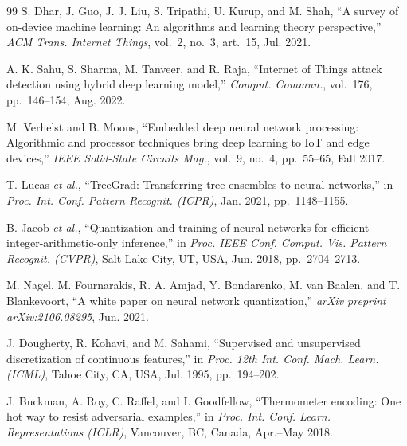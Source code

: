 \documentclass[journal,10pt]{IEEEtran}
\begin{document}
\begin{thebibliography}{99}
S. Dhar, J. Guo, J. J. Liu, S. Tripathi, U. Kurup, and M. Shah,
``A survey of on-device machine learning: An algorithms and learning
theory perspective,''
\emph{ACM Trans. Internet Things}, vol.~2, no.~3, art.~15, Jul. 2021.

A. K. Sahu, S. Sharma, M. Tanveer, and R. Raja,
``Internet of Things attack detection using hybrid deep learning
model,''
\emph{Comput. Commun.}, vol.~176, pp.~146--154, Aug. 2022.

M. Verhelst and B. Moons,
``Embedded deep neural network processing: Algorithmic and processor
techniques bring deep learning to IoT and edge devices,''
\emph{IEEE Solid-State Circuits Mag.}, vol.~9, no.~4, pp.~55--65,
Fall 2017.

T. Lucas \emph{et al.},
``TreeGrad: Transferring tree ensembles to neural networks,''
in \emph{Proc. Int. Conf. Pattern Recognit. (ICPR)},
Jan. 2021, pp.~1148--1155.

B. Jacob \emph{et al.},
``Quantization and training of neural networks for efficient
integer-arithmetic-only inference,''
in \emph{Proc. IEEE Conf. Comput. Vis. Pattern Recognit. (CVPR)},
Salt Lake City, UT, USA, Jun. 2018, pp.~2704--2713.

M. Nagel, M. Fournarakis, R. A. Amjad, Y. Bondarenko, M. van Baalen,
and T. Blankevoort,
``A white paper on neural network quantization,''
\emph{arXiv preprint arXiv:2106.08295}, Jun. 2021.

J. Dougherty, R. Kohavi, and M. Sahami,
``Supervised and unsupervised discretization of continuous features,''
in \emph{Proc. 12th Int. Conf. Mach. Learn. (ICML)},
Tahoe City, CA, USA, Jul. 1995, pp.~194--202.

J. Buckman, A. Roy, C. Raffel, and I. Goodfellow,
``Thermometer encoding: One hot way to resist adversarial examples,''
in \emph{Proc. Int. Conf. Learn. Representations (ICLR)},
Vancouver, BC, Canada, Apr.--May 2018.

\end{thebibliography}
\end{document}
